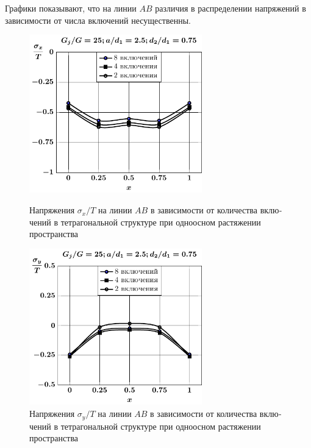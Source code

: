 \begin{russian}
Графики показывают, что на линии $AB$ различия в распределении напряжений в зависимости от числа включений несущественны.

\begin{figure}[h!]
\centering\footnotesize
\parbox[b]{7.5cm}{\centering\includegraphics[width=7.5cm]{inc8-4-2-a25-d75-g25-sig_x-spheroids-tension1.pdf}
\caption{Напряжения $\sigma_x/T$ на линии $AB$ в зависимости от количества включений в тетрагональной структуре при одноосном растяжении пространства
\label{f:9:17}}}\hfil\hfil
\parbox[b]{7.5cm}{\centering\includegraphics[width=7.5cm]{inc8-4-2-a25-d75-g25-sig_y-spheroids-tension1.pdf}
\caption{Напряжения $\sigma_y/T$ на линии $AB$ в зависимости от количества включений в тетрагональной структуре при одноосном растяжении пространства
\label{f:9:18}}}
\end{figure}

%


\end{russian}
